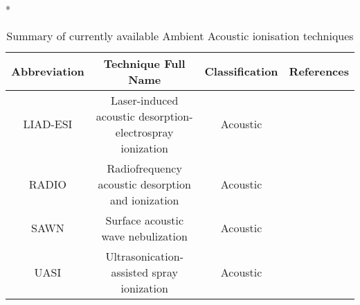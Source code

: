 \begin{table}{*}
\caption{Summary of currently available Ambient Acoustic ionisation techniques}
\label{table:Ambient_Acoustic}

\centering 
\scriptsize

    \begin{tabular}{|c|c|c|l|}
        \hline
        \textbf{Abbreviation}  & \textbf{Technique Full Name} & \textbf{Classification} & \textbf{References} \\ 
        \hline \hline 
        LIAD-ESI & Laser-induced acoustic desorption-electrospray ionization & Acoustic & \cite{19178334} \\
        RADIO & Radiofrequency acoustic desorption and ionization & Acoustic & \cite{19112029} \\
        SAWN & Surface acoustic wave nebulization & Acoustic & \cite{20364823} \\
        UASI & Ultrasonication-assisted spray ionization & Acoustic & \cite{20957254} \\
    \hline \hline 
    \end{tabular} 
\end{table}

